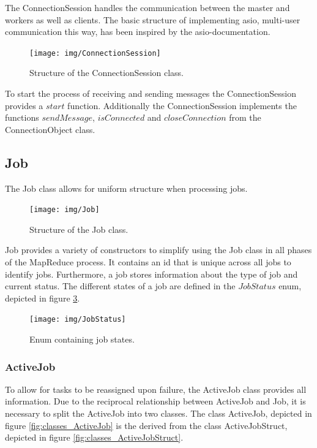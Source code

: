 \documentclass[12pt, letterpaper]{article}
\begin{document}
The ConnectionSession handles the communication between the master and workers as well as clients.
The basic structure of implementing asio, multi-user communication this way, has been inspired by the asio-documentation.

\begin{figure}[h]
	\centering
	\texttt{[image: img/ConnectionSession]}
	\caption{Structure of the ConnectionSession class.}
	\label{fig:classes_ConnectionSession}
\end{figure}

To start the process of receiving and sending messages the ConnectionSession provides a $start$ function. Additionally the ConnectionSession implements the functions $sendMessage$, $isConnected$ and $closeConnection$ from the ConnectionObject class.  

\pagebreak
\subsection{Job}

The Job class allows for uniform structure when processing jobs.

\begin{figure}[h]
	\centering
	\texttt{[image: img/Job]}
	\caption{Structure of the Job class.}
	\label{fig:classes_Job}
\end{figure}

Job provides a variety of constructors to simplify using the Job class in all phases of the MapReduce process. It contains an id that is unique across all jobs to identify jobs. Furthermore, a job stores information about the type of job and current status. The different states of a job are defined in the $JobStatus$ enum, depicted in figure \ref{fig:classes_JobStatus}.

\begin{figure}[h]
	\centering
	\texttt{[image: img/JobStatus]}
	\caption{Enum containing job states.}
	\label{fig:classes_JobStatus}
\end{figure}

\subsubsection{ActiveJob}

To allow for tasks to be reassigned upon failure, the ActiveJob class provides all information.
Due to the reciprocal relationship between ActiveJob and Job, it is necessary to split the ActiveJob into two classes. The class ActiveJob, depicted in figure \ref{fig:classes_ActiveJob} is the derived from the class ActiveJobStruct, depicted in figure \ref{fig:classes_ActiveJobStruct}.
\end{document}
